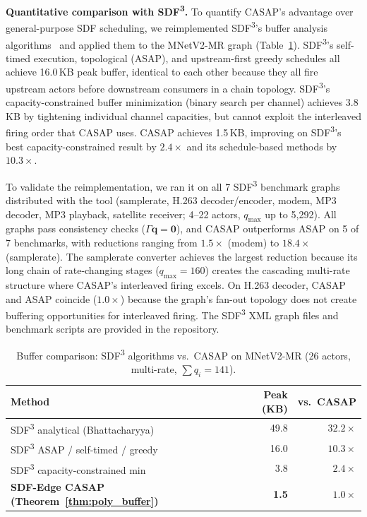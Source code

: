 \documentclass[journal]{IEEEtran}
\begin{document}
\textbf{Quantitative comparison with SDF\textsuperscript{3}.}
To quantify CASAP's advantage over general-purpose SDF scheduling, we reimplemented SDF\textsuperscript{3}'s buffer analysis algorithms~\cite{stuijk2006sdf3} and applied them to the MNetV2-MR graph (Table~\ref{tab:sdf3_comparison}).
SDF\textsuperscript{3}'s self-timed execution, topological (ASAP), and upstream-first greedy schedules all achieve 16.0\,KB peak buffer, identical to each other because they all fire upstream actors before downstream consumers in a chain topology.
SDF\textsuperscript{3}'s capacity-constrained buffer minimization (binary search per channel) achieves 3.8\,KB by tightening individual channel capacities, but cannot exploit the interleaved firing order that CASAP uses.
CASAP achieves 1.5\,KB, improving on SDF\textsuperscript{3}'s best capacity-constrained result by $2.4\times$ and its schedule-based methods by $10.3\times$.

To validate the reimplementation, we ran it on all 7 SDF\textsuperscript{3} benchmark graphs distributed with the tool (samplerate, H.263 decoder/encoder, modem, MP3 decoder, MP3 playback, satellite receiver; 4--22 actors, $q_{\max}$ up to 5{,}292).
All graphs pass consistency checks ($\Gamma \mathbf{q} = \mathbf{0}$), and CASAP outperforms ASAP on 5 of 7 benchmarks, with reductions ranging from $1.5\times$ (modem) to $18.4\times$ (samplerate).
The samplerate converter achieves the largest reduction because its long chain of rate-changing stages ($q_{\max} = 160$) creates the cascading multi-rate structure where CASAP's interleaved firing excels.
On H.263 decoder, CASAP and ASAP coincide ($1.0\times$) because the graph's fan-out topology does not create buffering opportunities for interleaved firing.
The SDF\textsuperscript{3} XML graph files and benchmark scripts are provided in the repository.

\begin{table}[htbp]
\centering
\caption{Buffer comparison: SDF\textsuperscript{3} algorithms vs.\ CASAP on MNetV2-MR (26 actors, multi-rate, $\sum q_i = 141$).}
\label{tab:sdf3_comparison}
\begin{tabular}{@{}lrr@{}}
\toprule
Method & Peak (KB) & vs.\ CASAP \\
\midrule
SDF\textsuperscript{3} analytical (Bhattacharyya) & 49.8 & $32.2\times$ \\
SDF\textsuperscript{3} ASAP / self-timed / greedy & 16.0 & $10.3\times$ \\
SDF\textsuperscript{3} capacity-constrained min & 3.8 & $2.4\times$ \\
\textbf{SDF-Edge CASAP (Theorem~\ref{thm:poly_buffer})} & \textbf{1.5} & $\mathbf{1.0\times}$ \\
\bottomrule
\end{tabular}
\end{table}
\end{document}
